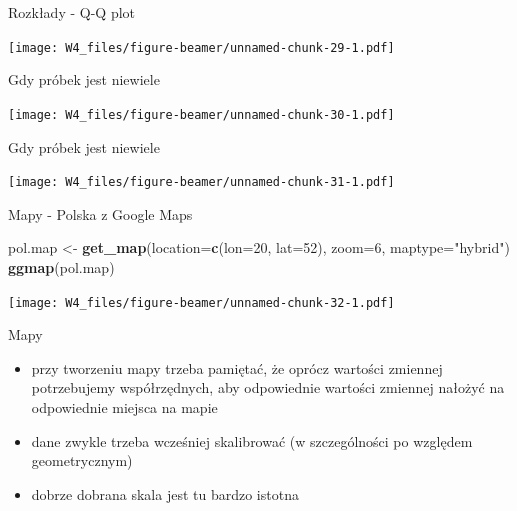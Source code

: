 \documentclass[ignorenonframetext,]{beamer}
\newenvironment{Shaded}{\begin{snugshade}}{\end{snugshade}}
\newcommand{\KeywordTok}[1]{\textcolor[rgb]{0.13,0.29,0.53}{\textbf{{#1}}}}
\newcommand{\DataTypeTok}[1]{\textcolor[rgb]{0.13,0.29,0.53}{{#1}}}
\newcommand{\DecValTok}[1]{\textcolor[rgb]{0.00,0.00,0.81}{{#1}}}
\newcommand{\StringTok}[1]{\textcolor[rgb]{0.31,0.60,0.02}{{#1}}}
\newcommand{\NormalTok}[1]{{#1}}
\providecommand{\tightlist}{%
\setlength{\itemsep}{0pt}\setlength{\parskip}{0pt}}
\begin{document}
\begin{frame}{Rozkłady - Q-Q plot}

\texttt{[image: W4\_files/figure-beamer/unnamed-chunk-29-1.pdf]}

\end{frame}

\begin{frame}{Gdy próbek jest niewiele}

\texttt{[image: W4\_files/figure-beamer/unnamed-chunk-30-1.pdf]}

\end{frame}

\begin{frame}{Gdy próbek jest niewiele}

\texttt{[image: W4\_files/figure-beamer/unnamed-chunk-31-1.pdf]}

\end{frame}

\begin{frame}[fragile]{Mapy - Polska z Google Maps}

\begin{Shaded}
\begin{Highlighting}[]
\NormalTok{pol.map <-}\StringTok{ }\KeywordTok{get_map}\NormalTok{(}\DataTypeTok{location=}\KeywordTok{c}\NormalTok{(}\DataTypeTok{lon=}\DecValTok{20}\NormalTok{, }\DataTypeTok{lat=}\DecValTok{52}\NormalTok{),}
                   \DataTypeTok{zoom=}\DecValTok{6}\NormalTok{, }\DataTypeTok{maptype=}\StringTok{"hybrid"}\NormalTok{)}
\KeywordTok{ggmap}\NormalTok{(pol.map)}
\end{Highlighting}
\end{Shaded}

\texttt{[image: W4\_files/figure-beamer/unnamed-chunk-32-1.pdf]}

\end{frame}

\begin{frame}{Mapy}

\begin{itemize}
\tightlist
\item
  przy tworzeniu mapy trzeba pamiętać, że oprócz wartości zmiennej
  potrzebujemy współrzędnych, aby odpowiednie wartości zmiennej nałożyć
  na odpowiednie miejsca na mapie
\item
  dane zwykle trzeba wcześniej skalibrować (w szczególności po względem
  geometrycznym)
\item
  dobrze dobrana skala jest tu bardzo istotna
\end{itemize}

\end{frame}
\end{document}
